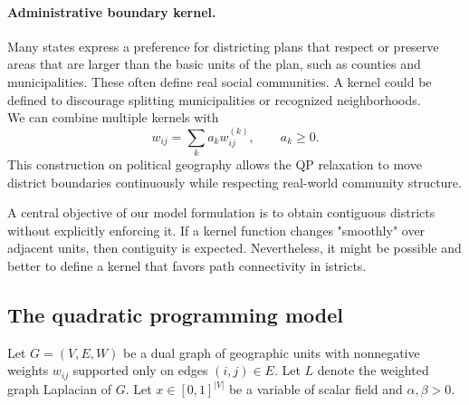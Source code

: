 \documentclass[11pt]{article}
\begin{document}
\paragraph{Administrative boundary kernel.}

Many states express a preference for districting plans that respect or preserve areas that are larger than the basic units of the plan, such as counties and municipalities. These often define real social communities. A kernel could be defined to discourage splitting municipalities or recognized neighborhoods. \\


We can combine multiple kernels with
\[
w_{ij}
=
\sum_k a_k w_{ij}^{(k)},
\qquad a_k \ge 0.
\]
This construction on political geography allows the QP relaxation to move district boundaries continuously while respecting real-world community structure.

A central objective of our model formulation is to obtain contiguous districts without explicitly enforcing it. If a kernel function changes "smoothly" over adjacent units, then contiguity is expected. Nevertheless, it might be possible and better to define a kernel that favors path connectivity in istricts.

\subsection{The quadratic programming model}\label{sec:model}

Let $G=(V,E,W)$ be a dual graph of geographic units with nonnegative weights $w_{ij}$ supported only on edges $(i,j)\in E$. Let $L$ denote the weighted graph Laplacian of $G$. Let $x \in [0,1]^{|V|}$ be a variable of scalar field and $\alpha, \beta >0$. 
\end{document}
